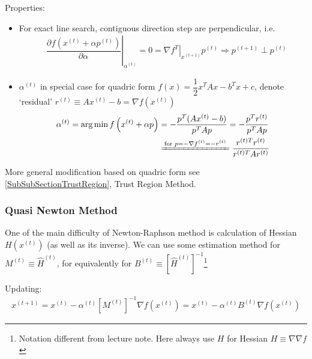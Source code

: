 \begin{itemize}[topsep=2pt,itemsep=0pt]
    Properties: 
    \begin{itemize}[topsep=2pt,itemsep=0pt]
        \item For exact line search, contiguous direction step are perpendicular, i.e.
\begin{align}
    &\left.\dfrac{\partial^{} f\left(x^{(t)}+\alpha p^{(t)}\right)}{\partial \alpha ^{}}\right|_{\alpha ^{(t)}}=0=\left.\nabla f^T\right|_{x^{(t+1)}}p^{(t)}
    \Rightarrow p^{(t+1)}\perp p^{(t)}
\end{align}        
        \item $ \alpha ^{(t)} $ in special case for quadric form $ f(x)=\dfrac{1}{2}x^TAx-b^Tx+c $, denote `residual' $ r^{(t)}\equiv Ax^{(t)}-b=\nabla f\left(x^{(t)}\right) $
        \begin{align}
            \alpha ^{(t)}=\arg\min f\left( x^{(t)}+\alpha p \right)&=-\dfrac{p^T(Ax^{(t)}-b)}{p^TAp}=-\dfrac{p^Tr^{(t)}}{p^TAp}\\
            &\xlongequal{\text{for } p=-\nabla f^{(t)}=-r^{(t)}}\dfrac{r^{(t)T}r^{(t)}}{r^{(t)T}Ar^{(t)}}
        \end{align}
    \end{itemize}
    
    
    
\end{itemize}

    More general modification based on quadric form see \autoref{SubSubSectionTrustRegion}, Trust Region Method.
    


\subsubsection{Quasi Newton Method}
\hypertarget{QuasiNewtonMethod}{}
    One of the main difficulty of Newton-Raphson method is calculation of Hessian $ H\left(x^{(t)}\right) $ (as well as its inverse). We can use some estimation method for $ M^{(t)}\equiv \hat{H}^{(t)} $, for equivalently for $ B^{(t)}\equiv\left[\hat{H}^{(t)}\right]^{-1} $\footnote{Notation different from lecture note. Here always use $ H $ for Hessian $ H\equiv\nabla\nabla f $}

    Updating:
    \begin{align}
        x^{(t+1)}=x^{(t)}-\alpha ^{(t)}\left[ M^{(t)} \right]^{-1}\nabla f\left(x^{(t)}\right)=x^{(t)}-\alpha ^{(t)}B^{(t)}\nabla f\left(x^{(t)}\right) 
    \end{align}
    
    

